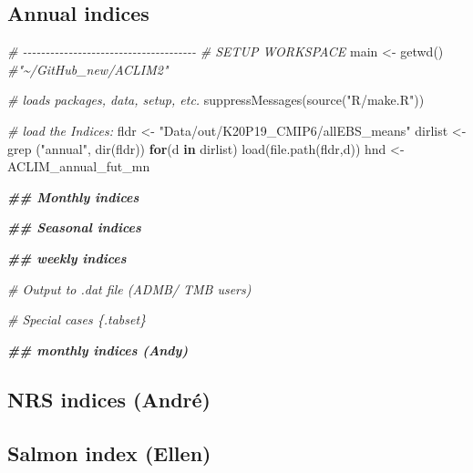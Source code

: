 \documentclass[
]{article}
\newenvironment{Shaded}{\begin{snugshade}}{\end{snugshade}}
\newcommand{\CommentTok}[1]{\textcolor[rgb]{0.56,0.35,0.01}{\textit{#1}}}
\newcommand{\ControlFlowTok}[1]{\textcolor[rgb]{0.13,0.29,0.53}{\textbf{#1}}}
\newcommand{\DocumentationTok}[1]{\textcolor[rgb]{0.56,0.35,0.01}{\textbf{\textit{#1}}}}
\newcommand{\FunctionTok}[1]{\textcolor[rgb]{0.00,0.00,0.00}{#1}}
\newcommand{\NormalTok}[1]{#1}
\newcommand{\OtherTok}[1]{\textcolor[rgb]{0.56,0.35,0.01}{#1}}
\newcommand{\StringTok}[1]{\textcolor[rgb]{0.31,0.60,0.02}{#1}}
\begin{document}
\hypertarget{annual-indices-1}{%
\subsection{Annual indices}\label{annual-indices-1}}

\begin{Shaded}
\begin{Highlighting}[]
    \CommentTok{\# {-}{-}{-}{-}{-}{-}{-}{-}{-}{-}{-}{-}{-}{-}{-}{-}{-}{-}{-}{-}{-}{-}{-}{-}{-}{-}{-}{-}{-}{-}{-}{-}{-}{-}{-}{-}{-}{-}}
    \CommentTok{\# SETUP WORKSPACE}
\NormalTok{    main   }\OtherTok{\textless{}{-}} \FunctionTok{getwd}\NormalTok{()  }\CommentTok{\#"\textasciitilde{}/GitHub\_new/ACLIM2"}
    
    \CommentTok{\# loads packages, data, setup, etc.}
    \FunctionTok{suppressMessages}\NormalTok{(}\FunctionTok{source}\NormalTok{(}\StringTok{"R/make.R"}\NormalTok{))}
    
    
    \CommentTok{\# load the Indices:}
\NormalTok{    fldr }\OtherTok{\textless{}{-}} \StringTok{"Data/out/K20P19\_CMIP6/allEBS\_means"}
\NormalTok{    dirlist }\OtherTok{\textless{}{-}}\FunctionTok{grep}\NormalTok{ (}\StringTok{"annual"}\NormalTok{, }\FunctionTok{dir}\NormalTok{(fldr))}
    \ControlFlowTok{for}\NormalTok{(d }\ControlFlowTok{in}\NormalTok{ dirlist)}
      \FunctionTok{load}\NormalTok{(}\FunctionTok{file.path}\NormalTok{(fldr,d))}
\NormalTok{    hnd }\OtherTok{\textless{}{-}}\NormalTok{ ACLIM\_annual\_fut\_mn}
    
\StringTok{\textasciigrave{}\textasciigrave{}\textasciigrave{}\textasciigrave{}}

\DocumentationTok{\#\# Monthly indices}

\DocumentationTok{\#\# Seasonal indices}

\DocumentationTok{\#\# weekly indices}

\CommentTok{\# Output to .dat file (ADMB/ TMB users)}

\CommentTok{\# Special cases \{.tabset\}}

\DocumentationTok{\#\# monthly indices (Andy)}
\end{Highlighting}
\end{Shaded}

\hypertarget{nrs-indices-andruxe9}{%
\subsection{NRS indices (André)}\label{nrs-indices-andruxe9}}

\hypertarget{salmon-index-ellen}{%
\subsection{Salmon index (Ellen)}\label{salmon-index-ellen}}
\end{document}
